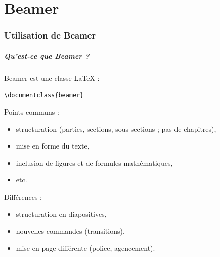 


\part{Beamer}


\section{Utilisation de Beamer}


\begin{frame}[fragile]
  \frametitle{Qu'est-ce que Beamer ?}

Beamer est une classe \LaTeX{} :

\lstinline?\documentclass{beamer}?

\medskip
Points communs :
\begin{itemize}
  \item structuration (parties, sections, sous-sections ; pas de chapitres),
  \item mise en forme du texte,
  \item inclusion de figures et de formules mathématiques,
  \item etc.
\end{itemize}

\medskip
Différences :
\begin{itemize}
  \item structuration en diapositives,
  \item nouvelles commandes (transitions),
  \item mise en page différente (police, agencement).
\end{itemize}
\end{frame}



